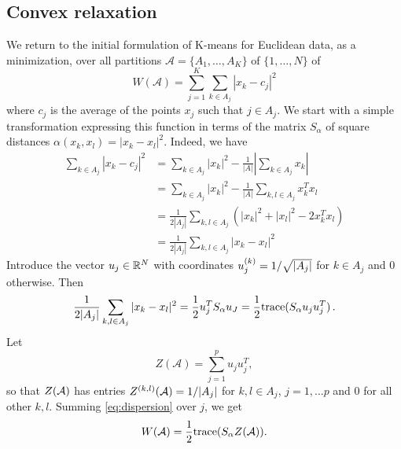 \subsection{Convex relaxation}
\label{sec:kmeans.relax}
We return to the initial formulation of K-means for Euclidean data, as a minimization, over all partitions  $\mathcal A = \{A_1, \ldots, A_K\}$ of $\{1, \ldots, N\}$ of 
\[
W(\mathcal A) = \sum_{j=1}^K \sum_{k\in A_j} |x_k - c_j|^2
\]
where $c_j$ is the average of the points $x_j$ such that $j\in A_j$. 
We start with a simple transformation expressing this function in terms of the matrix $S_\alpha$ of square distances $\alpha(x_k,x_l) = |x_k - x_l|^2$. Indeed, we have 
\begin{align*}
\sum_{k\in A_j} |x_k - c_j|^2 &= \sum_{k\in A_j} |x_k|^2 - \frac{1}{|A|}\left|\sum_{k\in A_j} x_k \right|\\
&= \sum_{k\in A_j} |x_k|^2 - \frac{1}{|A|}\sum_{k,l\in A_j} x_k^T x_l \\ 
&= \frac1{2|A_j|} \sum_{k,l\in A_j} (|x_k|^2 + |x_l|^2 - 2 x_k^T x_l) \\ 
&= \frac1{2|A_j|} \sum_{k,l\in A_j} |x_k - x_l|^2  
\end{align*}
Introduce the vector $u_j\in {\mathbb{R}}^N$ with coordinates $u_j^{(k)} = 1/\sqrt{|A_j|}$ for $k\in A_j$ and 0 otherwise. Then 
\begin{equation}
\label{eq:dispersion}
\frac1{2|A_j|} \sum_{k,l\in A_j} |x_k - x_l|^2 = \frac12 u_j^T S_\alpha u_J =  \frac{1}{2} {\mathrm{trace}}(S_\alpha u_j u_j^T)\,.
\end{equation}
Let
\[
Z(\mathcal A) = \sum_{j=1}^p u_ju_j^T,
\]
so that $Z({\mathcal A})$ has entries $Z^{(k,l)}({\mathcal A}) = 1/|A_j|$ for $k,l\in A_j$, $j= 1, \ldots p$ and 0  for all other $k,l$. Summing \cref{eq:dispersion} over $j$,
we get
\[
W({\mathcal A}) = \frac{1}{2} {\mathrm{trace}}(S_\alpha Z({\mathcal A})).
\]


